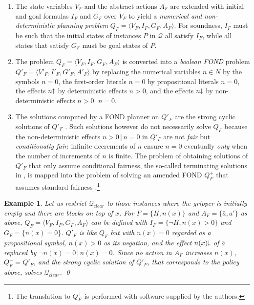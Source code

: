 \documentclass[letterpaper]{article} %
\newcommand{\tup}[1]{\langle #1 \rangle}
\newtheorem{example}[definition]{Example}
\newcommand{\Q}{\mathcal{Q}}
\newcommand{\pplus}{\hspace{-.05em}\raisebox{.15ex}{\footnotesize$\uparrow$}}
\newcommand{\mminus}{\hspace{-.05em}\raisebox{.15ex}{\footnotesize$\downarrow$}}
\begin{document}
\begin{enumerate}[1.]
  \item The state variables $V_F$ and the abstract actions $A_F$ are
    extended with initial and goal formulas $I_F$ and $G_F$ over $V_F$
    to yield a \emph{numerical and non-deterministic planning problem}
    $Q_F=\tup{V_F,I_F,G_F,A_F}$. For soundness, $I_F$ must be such that
    the initial states of instances $P$ in $\Q$ all satisfy $I_F$, while
    all states that satisfy $G_F$ must be goal states of $P$.
%
  \item The problem $Q_F=\tup{V_F,I_F,G_F,A_F}$ is converted into a
    \emph{boolean FOND} problem $Q'_F=\tup{V'_F,I'_F,G'_F,A'_F}$ by
    replacing the numerical variables $n\in N$ by the symbols $n=0$,
    the first-order literals $n=0$ by propositional literals  $n=0$, 
    the effects $n\pplus$ by deterministic effects $n > 0$, and the
    effects $n\mminus$ by non-deterministic effects $n>0\,|\,n=0$.
%
  \item The solutions computed by a FOND planner on $Q'_F$ are the
    strong cyclic solutions of $Q'_F$ \cite{strong-cyclic}.
    Such solutions however do not necessarily solve $Q_F$ because the
    non-deterministic effects $n>0\,|\,n=0$ in $Q'_F$ are not \emph{fair} but
    \emph{conditionally fair}: infinite decrements of $n$ ensure
    $n=0$ eventually \emph{only} when the number of increments of $n$ is finite.
    The problem of obtaining solutions of $Q'_F$ that only assume conditional
    fairness, the so-called terminating solutions in \cite{srivastava:aaai2011},
    is mapped into the problem of solving an amended FOND $Q^+_F$ that
     assumes standard  fairness \cite{bonet:ijcai2017}.\footnote{The
    translation to $Q^+_F$ is performed with software supplied by the authors.}
\end{enumerate}


\begin{example}
  Let us restrict  $\Q_{clear}$  to those  instances where  the gripper is initially empty
  and there are blocks on top of $x$. For $F=\{H,n(x)\}$  and $A_F=\{\bar{a},\bar{a'}\}$ as above, 
  $Q_F=\tup{V_F,I_F,G_F,A_F}$ can be defined with $I_F=\{\neg H, n(x) > 0\}$ and $G_F=\{n(x)=0\}$.
  $Q'_F$ is like $Q_F$ but with $n(x)=0$ regarded as a propositional symbol, $n(x) > 0$
  as its negation, and the effect $n(x)\mminus$ of  $\bar{a}$ replaced by  $\neg n(x)=0 \, | \, n(x)=0$.
  Since  no action in $A_F$  increases $n(x)$,   $Q^+_F=Q'_F$, and the strong cyclic solution  of $Q'_F$,
  that corresponds to the policy above, solves $\Q_{clear}$. \qed
\end{example}
\end{document}
